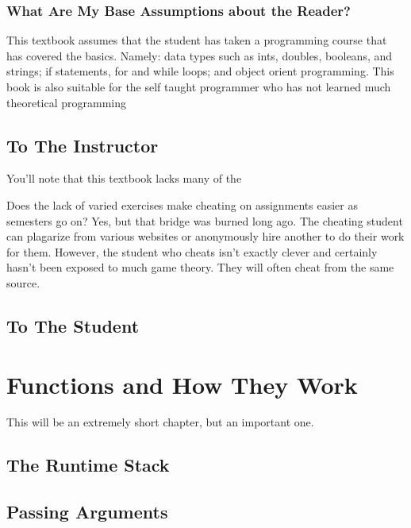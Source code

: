 \documentclass[10pt,a4paper]{book}
\begin{document}
\subsection{What Are My Base Assumptions about the Reader?}

This textbook assumes that the student has taken a programming course that has covered the basics.
Namely: data types such as ints, doubles, booleans, and strings; if statements, for and while loops; and object orient programming.
This book is also suitable for the self taught programmer who has not learned much theoretical programming

\section{To The Instructor}

You'll note that this textbook lacks many of the 



Does the lack of varied exercises make cheating on assignments easier as semesters go on?  Yes, but that bridge was burned long ago.  
The cheating student can plagarize from various websites or anonymously hire another to do their work for them.
However, the student who cheats isn't exactly clever and certainly hasn't been exposed to much game theory.  
They will often cheat from the same source.  




\section{To The Student}




\chapter{Functions and How They Work}

This will be an extremely short chapter, but an important one.

\section{The Runtime Stack}


\section{Passing Arguments}
\end{document}
